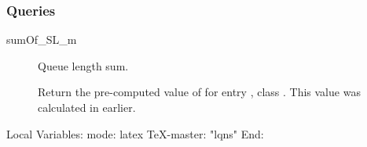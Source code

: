 \subsubsection{Queries}

\begin{description}

\item[sumOf_SL_m] \texonly{---} Queue length sum.\\

Return the pre-computed value of  for entry , class
.  This value was calculated in
 earlier.

\end{description}

\C Local Variables: 
\C mode: latex
\C TeX-master: "lqns"
\C End: 
